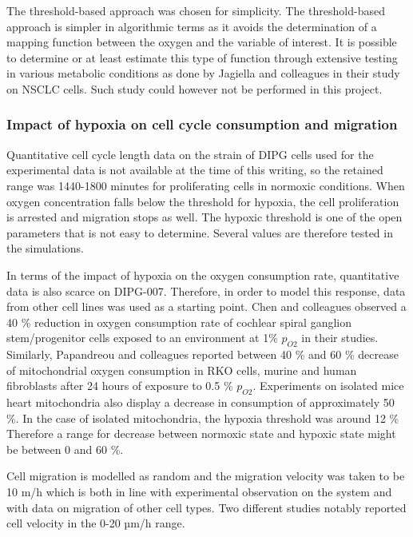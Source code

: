 \documentclass[11pt,a4paper]{article}
\begin{document}
%
The threshold-based approach was chosen for simplicity. The threshold-based approach is simpler in algorithmic terms  as it avoids the determination of a mapping function between the oxygen and the variable of interest. It is possible to determine or at least estimate this type of function through extensive testing in various metabolic conditions as done by Jagiella and colleagues in their study on NSCLC cells.\cite{Jagiella2016} Such study could however not be performed in this project. 

\subsubsection{Impact of hypoxia on cell cycle consumption and migration}
Quantitative cell cycle length data on the strain of DIPG cells used for the experimental data is not available at the time of this writing, so the retained range was 1440-1800 minutes for proliferating cells in normoxic conditions. When oxygen concentration falls below the threshold for hypoxia, the cell proliferation is arrested and migration stops as well. The hypoxic threshold is one of the open parameters that is not easy to determine. Several values are therefore tested in the simulations.

In terms of the impact of hypoxia on the oxygen consumption rate, quantitative data is also scarce on DIPG-007. Therefore, in order to model this response, data from other cell lines was used as a starting point. Chen and colleagues observed a 40 \% reduction in oxygen consumption rate of cochlear spiral ganglion stem/progenitor cells exposed to an environment at 1\% $p_{O2}$ in their studies.\cite{Chen2015} Similarly, Papandreou and colleagues reported between 40 \% and 60 \% decrease of mitochondrial oxygen consumption in RKO cells, murine and human fibroblasts after 24 hours of exposure to 0.5 \% $p_{O2}$.\cite{Papandreou2006} Experiments on isolated mice heart mitochondria also display a decrease in consumption of approximately 50 \%.\cite{Zhu2020} In the case of isolated mitochondria, the hypoxia threshold was around 12 \% Therefore a range for decrease between normoxic state and hypoxic state might be between 0 and 60 \%.

Cell migration is modelled as random and the migration velocity was taken to be 10 \textmu m/h which is both in line with experimental observation on the system and with data on migration of other cell types.\cite{Friedl2003} Two different studies notably reported cell velocity in the 0-20 µm/h range.\cite{Demuth2000}\cite{Sengul2021}
\end{document}
